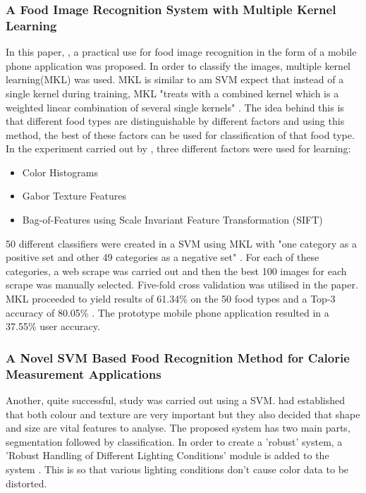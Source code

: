 \subsubsection*{A Food Image Recognition System with Multiple Kernel Learning}
In this paper, \textcite{kernelLearning}, a practical use for food image recognition in the form of a mobile phone application was proposed. In order to classify the images, multiple kernel learning(MKL) was used. MKL is similar to am SVM expect that instead of a single kernel during training, MKL "treats with a combined kernel which is a weighted linear combination of several single kernels" \textcite{kernelLearning}. The idea behind this is that different food types are distinguishable by different factors and using this method, the best of these factors can be used for classification of that food type. In the experiment carried out by \textcite{kernelLearning}, three different factors were used for learning:
\begin{itemize}
	\item{Color Histograms}
	\item{Gabor Texture Features}
	\item{Bag-of-Features using Scale Invariant Feature Transformation (SIFT)}
\end{itemize}

50 different classifiers were created in a SVM using MKL with "one category as a positive set and other 49 categories as a negative set" \textcite{kernelLearning}. For each of these categories, a web scrape was carried out and then the best 100 images for each scrape was manually selected. Five-fold cross validation was utilised in the paper. MKL proceeded to yield results of 61.34\% on the 50 food types and a Top-3 accuracy of 80.05\% \textcite{kernelLearning}. The prototype mobile phone application resulted in a 37.55\% user accuracy.

\subsubsection*{A Novel SVM Based Food Recognition Method for Calorie Measurement Applications}
Another, quite successful, study was carried out using a SVM. \textcite{novelSVM} had established that both colour and texture are very important but they also decided that shape and size are vital features to analyse. The proposed system has two main parts, segmentation followed by classification. In order to create a 'robust' system, a 'Robust Handling of Different Lighting Conditions' module is added to the system \textcite{novelSVM}. This is so that various lighting conditions don't cause color data to be distorted. 

